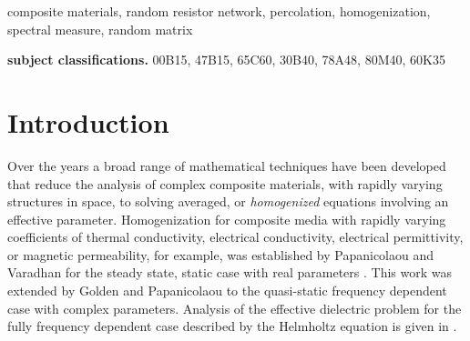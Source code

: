 \documentclass{cmslatex}
\begin{document}
\begin{keywords}
composite materials, random resistor network, percolation,
homogenization, spectral measure, random matrix 
\smallskip

{\bf subject classifications.}
00B15,
47B15,
65C60,
30B40,
78A48,
80M40,
60K35
\end{keywords}


\section{Introduction}\label{Introduction}
%
Over the years a broad range of mathematical techniques have been
developed that reduce the analysis of complex composite materials,
with rapidly varying structures in space, to solving averaged, or
\emph{homogenized} equations involving an effective parameter.
Homogenization for composite media with rapidly varying coefficients
of thermal conductivity,  
electrical conductivity, electrical permittivity, or magnetic permeability,
for example,
was established by Papanicolaou and Varadhan \cite{Papanicolaou:RF-835}
for the steady state, static case with real parameters \cite{MILTON:2002:TC}. 
This work was extended
by Golden and Papanicolaou \cite{Golden:CMP-473,Golden:JSP-655} to the
quasi-static frequency dependent case with complex
parameters. Analysis of the effective dielectric problem for the fully
frequency dependent case described by the Helmholtz equation is given
in \cite{Simeonova:MMS:1113}.
\end{document}
